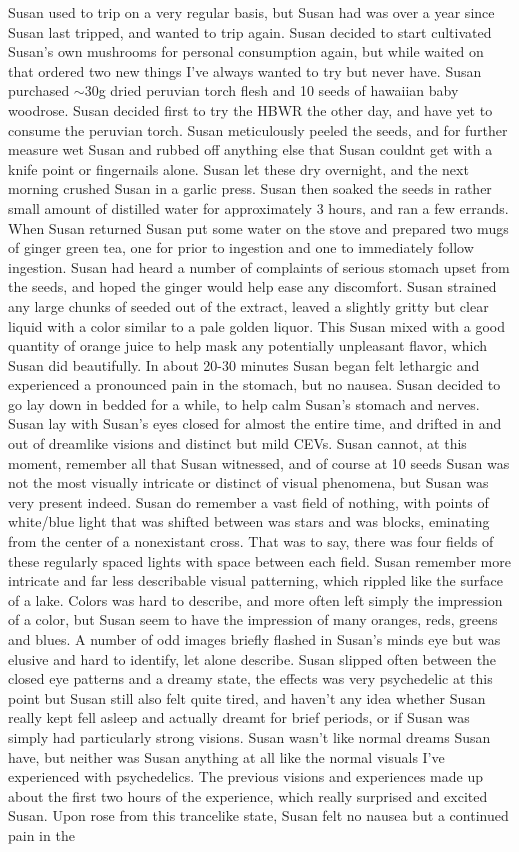 \documentclass[12pt]{book}
\begin{document}
Susan used to trip on a very regular basis, but Susan had was over a year since Susan last tripped, and wanted to trip again. Susan decided to start cultivated Susan's own mushrooms for personal consumption again, but while waited on that ordered two new things I've always wanted to try but never have. Susan purchased $\sim$30g dried peruvian torch flesh and 10 seeds of hawaiian baby woodrose. Susan decided first to try the HBWR the other day, and have yet to consume the peruvian torch. Susan meticulously peeled the seeds, and for further measure wet Susan and rubbed off anything else that Susan couldnt get with a knife point or fingernails alone. Susan let these dry overnight, and the next morning crushed Susan in a garlic press. Susan then soaked the seeds in rather small amount of distilled water for approximately 3 hours, and ran a few errands. When Susan returned Susan put some water on the stove and prepared two mugs of ginger green tea, one for prior to ingestion and one to immediately follow ingestion. Susan had heard a number of complaints of serious stomach upset from the seeds, and hoped the ginger would help ease any discomfort. Susan strained any large chunks of seeded out of the extract, leaved a slightly gritty but clear liquid with a color similar to a pale golden liquor. This Susan mixed with a good quantity of orange juice to help mask any potentially unpleasant flavor, which Susan did beautifully. In about 20-30 minutes Susan began felt lethargic and experienced a pronounced pain in the stomach, but no nausea. Susan decided to go lay down in bedded for a while, to help calm Susan's stomach and nerves. Susan lay with Susan's eyes closed for almost the entire time, and drifted in and out of dreamlike visions and distinct but mild CEVs. Susan cannot, at this moment, remember all that Susan witnessed, and of course at 10 seeds Susan was not the most visually intricate or distinct of visual phenomena, but Susan was very present indeed. Susan do remember a vast field of nothing, with points of white/blue light that was shifted between was stars and was blocks, eminating from the center of a nonexistant cross. That was to say, there was four fields of these regularly spaced lights with space between each field. Susan remember more intricate and far less describable visual patterning, which rippled like the surface of a lake. Colors was hard to describe, and more often left simply the impression of a color, but Susan seem to have the impression of many oranges, reds, greens and blues. A number of odd images briefly flashed in Susan's minds eye but was elusive and hard to identify, let alone describe. Susan slipped often between the closed eye patterns and a dreamy state, the effects was very psychedelic at this point but Susan still also felt quite tired, and haven't any idea whether Susan really kept fell asleep and actually dreamt for brief periods, or if Susan was simply had particularly strong visions. Susan wasn't like normal dreams Susan have, but neither was Susan anything at all like the normal visuals I've experienced with psychedelics. The previous visions and experiences made up about the first two hours of the experience, which really surprised and excited Susan. Upon rose from this trancelike state, Susan felt no nausea but a continued pain in the 
\end{document}
